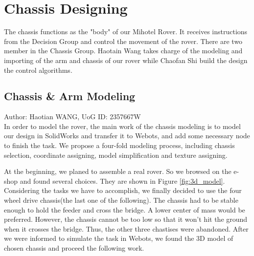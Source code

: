 \section{Chassis Designing\label{sec4.4}}
The chassis functions as the "body" of our Mihotel Rover. It receives instructions from the Decision Group and control the movement of the rover. There are two member in the Chassis Group. Haotain Wang takes charge of the modeling and importing of the arm and chassis of our rover while Chaofan Shi build the design the control algorithms.

\subsection{Chassis \& Arm Modeling}
Author: Haotian WANG, UoG ID: 2357667W\\

In order to model the rover, the main work of the chassis modeling is to model our design in SolidWorks and transfer it to Webots, and add some necessary node to finish the task. We propose a four-fold modeling process, including chassis selection, coordinate assigning, model simplification and texture assigning.

At the beginning, we planed to assemble a real rover. So we browsed on the e-shop and found several choices. They are shown in Figure \ref{fig:3d_model}. Considering the tasks we have to accomplish, we finally decided to use the four wheel drive chassis(the last one of the following). The chassis had to be stable enough to hold the feeder and cross the bridge. A lower center of mass would be preferred. However, the chassis cannot be too low so that it won't hit the ground when it crosses the bridge. Thus, the other three chastises were abandoned. After we were informed to simulate the task in Webots, we found the 3D model of chosen chassis and proceed the following work. 

